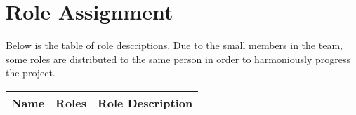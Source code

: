 \documentclass[conference]{IEEEtran}
\begin{document}
\section {Role Assignment}
Below is the table of role descriptions. Due to the small members in the team, some roles are distributed to the same person in order to harmoniously progress the project.

\begin{table}[htbp]
\begin{tabular}{| p{1cm}|p{1.5cm}|p{5.2cm} |}

\hline
Name & Roles & Role Description\\

\hline

\end{tabular}
\end{table}
\end{document}

